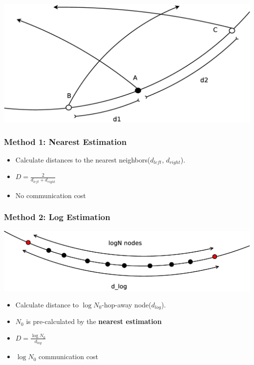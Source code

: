 \documentclass[red]{beamer}
\begin{document}
\begin{frame}
\centering
\includegraphics[scale=0.15]{figs/method1}
\frametitle{Method 1: Nearest Estimation}
\begin{itemize}
\item Calculate distances to the nearest neighbors($d_{left}$, $d_{right}$). 
\item $D = \frac{2}{d_{left}+d_{right}}$
\item No communication cost
\end{itemize}
\end{frame}
\begin{frame}
\frametitle{Method 2: Log Estimation}
\centering
\includegraphics[scale=0.2]{figs/method2}
\begin{itemize}
\item Calculate distance to $\log{N_0}$-hop-away node($d_{log}$).
\item $N_0$ is pre-calculated by the \textbf{nearest estimation}
\item $D = \frac{\log{N_0}}{d_{log}}$
\item $\log{N_0}$ communication cost
\end{itemize}
\end{frame}
\end{document}
